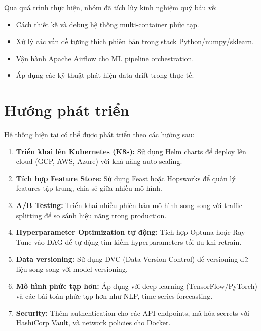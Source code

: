 \documentclass[12pt,a4paper]{report}
\begin{document}
Qua quá trình thực hiện, nhóm đã tích lũy kinh nghiệm quý báu về:
\begin{itemize}
  \item Cách thiết kế và debug hệ thống multi-container phức tạp.
  \item Xử lý các vấn đề tương thích phiên bản trong stack Python/numpy/sklearn.
  \item Vận hành Apache Airflow cho ML pipeline orchestration.
  \item Áp dụng các kỹ thuật phát hiện data drift trong thực tế.
\end{itemize}

\section{Hướng phát triển}

Hệ thống hiện tại có thể được phát triển theo các hướng sau:

\begin{enumerate}
  \item \textbf{Triển khai lên Kubernetes (K8s):} Sử dụng Helm charts để deploy lên cloud (GCP, AWS, Azure) với khả năng auto-scaling.

  \item \textbf{Tích hợp Feature Store:} Sử dụng Feast hoặc Hopsworks để quản lý features tập trung, chia sẻ giữa nhiều mô hình.

  \item \textbf{A/B Testing:} Triển khai nhiều phiên bản mô hình song song với traffic splitting để so sánh hiệu năng trong production.

  \item \textbf{Hyperparameter Optimization tự động:} Tích hợp Optuna hoặc Ray Tune vào DAG để tự động tìm kiếm hyperparameters tối ưu khi retrain.

  \item \textbf{Data versioning:} Sử dụng DVC (Data Version Control) để versioning dữ liệu song song với model versioning.

  \item \textbf{Mô hình phức tạp hơn:} Áp dụng với deep learning (TensorFlow/PyTorch) và các bài toán phức tạp hơn như NLP, time-series forecasting.

  \item \textbf{Security:} Thêm authentication cho các API endpoints, mã hóa secrets với HashiCorp Vault, và network policies cho Docker.
\end{enumerate}
\end{document}
